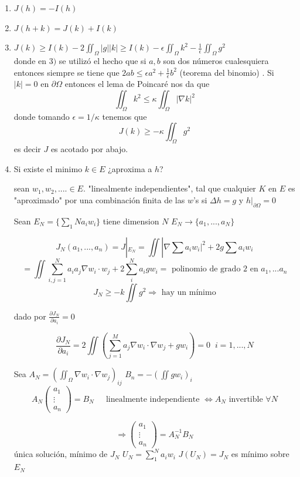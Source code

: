 \documentclass[a4paper,10pt]{book}
\begin{document}
\begin{enumerate}
\item $J(h)=-I(h)$
\item $J(h+k)= J(k)+I(k)$
\item $J(k)\geq I(k)-2\iint_\Omega |g||k| \geq I(k) - \epsilon \iint_\Omega k^2 -\frac{1}{\epsilon} \iint_\Omega g^2 $ \\
donde en $3)$ se utiliz\'o el hecho que si $a,b$ son dos n\'umeros cualesquiera entonces siempre se tiene
que  $2ab\leq \epsilon a^2 +\frac{1}{\epsilon} b^2 $ (teorema del binomio) . Si $|k|=0$ en $\partial\Omega$ entonces el lema de Poincar\'e
nos da que 
\[ \iint_\Omega k^2 \leq \kappa \iint_\Omega |\nabla k|^2\]
donde tomando  $\epsilon=1/\kappa$ tenemos que
\[J(k)\geq -\kappa \iint_\Omega g^2 \]
es decir $J$ es acotado por abajo.

\item Si existe el minimo $k\in E$ ¿aproxima a $h$?

sean $w_1,w_2,....\in E$. "linealmente independientes", tal que cualquier $K$ en $E$ 
es "aproximado" por una combinación finita de las $w$'s
si $\Delta h = g$ y $h|_{\partial \Omega} = 0$

Sean $E_N= \{ \sum\limits_{1}{N} a_i w_i \}$ tiene dimension $N$ $E_N \rightarrow\{ a_1,...,a_N\}$

\[
J_N(a_1,...,a_n) = J |_{E_N} = \iint |\nabla \sum\limits a_i w_i |^2 + 2g \sum\limits a_i w_i 
\]
\[= \iint \sum\limits_{i,j =1}^N a_i a_j \nabla w_i\cdot w_j + 2 \sum\limits_{i}^N a_i g w_i = \text{ polinomio de grado 2 en } a_1,...a_n\]
\[
J_N\geq -k \iint g^2  \Rightarrow \text{ hay un mínimo}
\]

dado por $\frac{\partial J_N }{\partial a_i} = 0$

\[
\frac{\partial J_N }{\partial a_i} = 2 \iint \left(  \sum\limits_{j=1}^M a_j \nabla w_i \cdot \nabla w_j + g w_i \right) = 0 \;\; i=1,...,N
\]

Sea  $ A_N= \left( \iint_{\Omega} \nabla w_i \cdot \nabla w_j \right)_{ij}$  $B_n= -\left(\iint g w_i  \right)_i $
\[
A_N  \left( 
\begin{array}{c} 
a_1\\
\vdots\\
a_n
\end{array} 
\right)=B_N  \;\;\;\; \text{ linealmente independiente } \Leftrightarrow  A_N \text{ invertible } \forall N
\]

\[
\Rightarrow 
\left( 
\begin{array}{c} 
a_1\\
\vdots\\
a_n
\end{array} \right) = A_N ^{-1} B_N 
\]
  única solución, mínimo de $J_N$
$U_N = \sum\limits_1^{N} a_i w_i$  $J(U_N)= J_N$ es mínimo sobre $E_N$


\end{enumerate}
\end{document}
